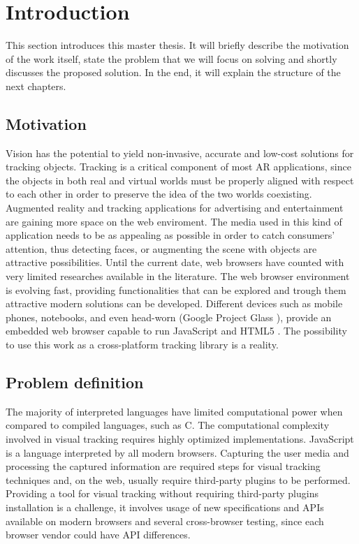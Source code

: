 \chapter{Introduction} %
\label{cha:introduction}

This section introduces this master thesis. It will briefly describe the motivation of the work itself, state the problem that we will focus on solving and shortly discusses the proposed solution. In the end, it will explain the structure of the next chapters.

\section{Motivation} %
\label{sec:introduction:motivation}

Vision has the potential to yield non-invasive, accurate and low-cost solutions for tracking objects. Tracking is a critical component of most AR applications, since the objects in both real and virtual worlds must be properly aligned with respect to each other in order to preserve the idea of the two worlds coexisting. Augmented reality and tracking applications for advertising and entertainment are gaining more space on the web enviroment. The media used in this kind of application needs to be as appealing as possible in order to catch consumers' attention, thus detecting faces, or augmenting the scene with objects are attractive possibilities. Until the current date, web browsers have counted with very limited researches available in the literature. The web browser environment is evolving fast, providing functionalities that can be explored and trough them attractive modern solutions can be developed. Different devices such as mobile phones, notebooks, and even head-worn \cite{Benford1998} (Google Project Glass \cite{Glass2013}), provide an embedded web browser capable to run JavaScript and HTML5 \cite{International2009,Hickson2013}. The possibility to use this work as a cross-platform tracking library is a reality.


\section{Problem definition} %
\label{sec:introduction:problem_definition}

The majority of interpreted languages have limited computational power when compared to compiled languages, such as C. The computational complexity involved in visual tracking requires highly optimized implementations. JavaScript \cite{International2009}  is a language interpreted by all modern browsers. Capturing the user media and processing the captured information are required steps for visual tracking techniques and, on the web, usually require third-party plugins to be performed. Providing a tool for visual tracking without requiring third-party plugins installation is a challenge, it involves usage of new specifications and APIs available on modern browsers and several cross-browser testing, since each browser vendor could have API differences.

